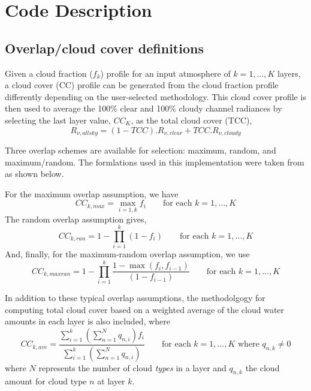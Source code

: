 \section{Code Description}
\label{sec:code_description}

\subsection{Overlap/cloud cover definitions}

Given a cloud fraction ($f_k$) profile for an input atmosphere of $k = 1,\ldots,K$ layers, a cloud cover (CC) profile can be generated from the cloud fraction profile differently depending on the user-selected methodology. This cloud cover profile is then used to average the 100\% clear and 100\% cloudy channel radiances by selecting the last layer value, $CC_K$, as the total cloud cover (TCC),
\begin{equation}
  R_{\nu,allsky} = (1 - TCC).R_{\nu,clear} + TCC.R_{\nu,cloudy}
\end{equation}

Three overlap schemes are available for selection: maximum, random, and maximum/random. The formlations used in this implementation were taken from \citet{MorcretteJakob_2000} as shown below.

For the maximum overlap assumption, we have
\begin{equation}
  CC_{k,max} = \max_{i=1,k}f_{i}\qquad\mbox{for each }k = 1,\ldots,K
  \label{eqn:maximum_cc}
\end{equation}
The random overlap assumption gives,
\begin{equation}
  CC_{k,ran} = 1 - \prod_{i=1}^k{(1 - f_{i})}\qquad\mbox{for each }k = 1,\ldots,K
  \label{eqn:random_cc}
\end{equation}
And, finally, for the maximum-random overlap assumption, we use
\begin{equation}
  CC_{k,maxran} = 1 - \prod_{i=1}^k{\frac{1 - \max(f_i,f_{i-1})}{(1 - f_{i-1})}}\qquad\mbox{for each }k = 1,\ldots,K
  \label{eqn:maxran_cc}
\end{equation}

In addition to these typical overlap assumptions, the methodolgogy for computing total cloud cover based on a weighted average of the cloud water amounts in each layer \citep{Geer_2009} is also included, where
\begin{equation}
  CC_{k,ave} = \frac{\displaystyle \sum_{i=1}^k{\left( \textstyle \sum_{n=1}^N{q_{n,i}} \right) f_i}}{\displaystyle \sum_{i=1}^k{\left( \textstyle \sum_{n=1}^N{q_{n,i}} \right)}}\qquad\mbox{for each } k = 1,\ldots,K\mbox{ where }q_{n,k} \neq 0
  \label{eqn:average_cc}
\end{equation}
where $N$ represents the number of cloud \emph{types} in a layer and $q_{n,k}$ the cloud amount for cloud type $n$ at layer $k$.


